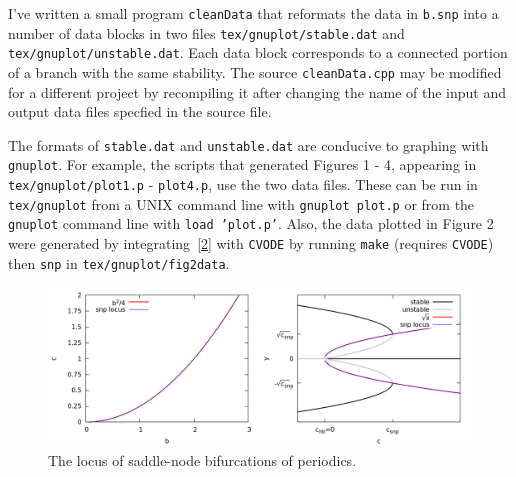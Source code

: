 \documentclass[a4paper,11pt]{article}
\begin{document}
\noindent
I've written a small program \texttt{cleanData} that reformats the data in \texttt{b.snp} into a number of data blocks in two files \texttt{tex/gnuplot/stable.dat} and \texttt{tex/gnuplot/unstable.dat}. Each data block corresponds to a connected portion of a branch with the same stability. The source \texttt{cleanData.cpp} may be modified for a different project by recompiling it after changing the name of the input and output data files specfied in the source file. \vspace{3mm}

\noindent
The formats of \texttt{stable.dat} and \texttt{unstable.dat} are conducive to graphing with \texttt{gnuplot}. For example, the scripts that generated Figures 1 - 4, appearing in \texttt{tex/gnuplot/plot1.p} - \texttt{plot4.p}, use the two data files. These can be run in \texttt{tex/gnuplot} from a UNIX command line with \texttt{gnuplot plot.p} or from the \texttt{gnuplot} command line with \texttt{load 'plot.p'}. Also, the data plotted in Figure 2 were generated by integrating~\eqref{2} with \texttt{CVODE} by running \texttt{make} (requires \texttt{CVODE}) then \texttt{snp} in \texttt{tex/gnuplot/fig2data}.
\begin{center}
\begin{figure}[H]
  \centering
    \includegraphics[scale=.4]{gnuplot/fig4.png}
 \caption{The locus of saddle-node bifurcations of periodics.}
\label{fig4}
\end{figure}
\end{center}
\end{document}
